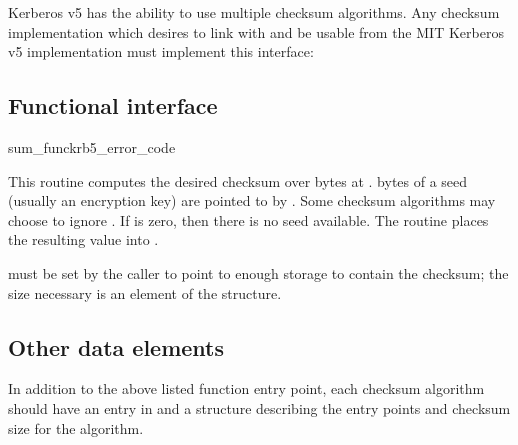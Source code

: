 Kerberos v5 has the ability to use multiple checksum algorithms.  Any
checksum implementation which desires to link with and be usable from the MIT
Kerberos v5 implementation must implement this interface:

\subsection{Functional interface}

\begin{funcdecl}{sum_func}{krb5_error_code}{\funcin}
\funcout
{}
\end{funcdecl}

This routine computes the desired checksum over  bytes
at .  bytes of a seed (usually an
encryption key) are pointed to by .  Some checksum
algorithms may choose to ignore .  If
 is zero, then there is no seed available.
The routine places the resulting value into .

 must be set by the caller to point
to enough storage to contain the checksum; the size necessary is an
element of the  structure.

\subsection{Other data elements}
In addition to the above listed function entry point, each checksum algorithm
should have an entry in  and a
 structure describing the entry points
and checksum size for the algorithm.
